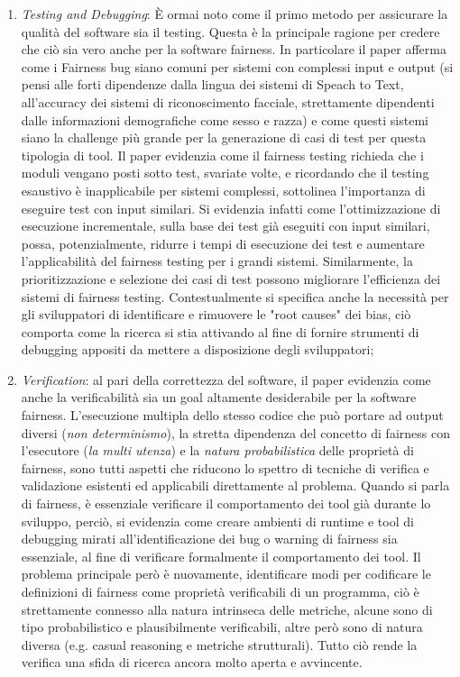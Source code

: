\begin{enumerate}
    \item \emph{Testing and Debugging}: È ormai noto come il primo metodo per assicurare la qualità del software sia il testing. Questa è la principale ragione per credere che ciò sia vero anche per la software fairness. In particolare il paper afferma come i Fairness bug siano comuni per sistemi con complessi input e output (si pensi alle forti dipendenze dalla lingua dei sistemi di Speach to Text, all'accuracy dei sistemi di riconoscimento facciale, strettamente dipendenti dalle informazioni demografiche come sesso e razza) e come questi sistemi siano la challenge più grande per la generazione di casi di test per questa tipologia di tool. Il paper evidenzia come il fairness testing richieda che i moduli vengano posti sotto test, svariate volte, e ricordando che il testing esaustivo è inapplicabile per sistemi complessi, sottolinea l'importanza di eseguire test con input similari. Si evidenzia infatti come l'ottimizzazione di esecuzione incrementale, sulla base dei test già eseguiti con input similari, possa, potenzialmente, ridurre i tempi di esecuzione dei test e aumentare l'applicabilità del fairness testing per i grandi sistemi. Similarmente, la prioritizzazione e selezione dei casi di test possono migliorare l'efficienza dei sistemi di fairness testing. Contestualmente si specifica anche la necessità per gli sviluppatori di identificare e rimuovere le "root causes" dei bias, ciò comporta come la ricerca si stia attivando al fine di fornire strumenti di debugging appositi da mettere a disposizione degli sviluppatori;
    
    \item\emph{Verification}: al pari della correttezza del software, il paper evidenzia come anche la verificabilità sia un goal altamente desiderabile per la software fairness. L'esecuzione multipla dello stesso codice che può portare ad output diversi (\textit{non determinismo}), la stretta dipendenza del concetto di fairness con l'esecutore (\textit{la multi utenza}) e la \emph{natura probabilistica} delle proprietà di fairness, sono tutti aspetti che riducono lo spettro di tecniche di verifica e validazione esistenti ed applicabili direttamente al problema. Quando si parla di fairness, è essenziale verificare il comportamento dei tool già durante lo sviluppo, perciò, si evidenzia come creare ambienti di runtime e tool di debugging mirati all'identificazione dei bug o warning di fairness sia essenziale, al fine di verificare formalmente il comportamento dei tool. Il problema principale però è nuovamente, identificare modi per codificare le definizioni di fairness come proprietà verificabili di un programma, ciò è strettamente connesso alla natura intrinseca delle metriche, alcune sono di tipo probabilistico e plausibilmente verificabili, altre però sono di natura diversa (e.g. casual reasoning e metriche strutturali). Tutto ciò rende la verifica una sfida di ricerca ancora molto aperta e avvincente.
\end{enumerate}

